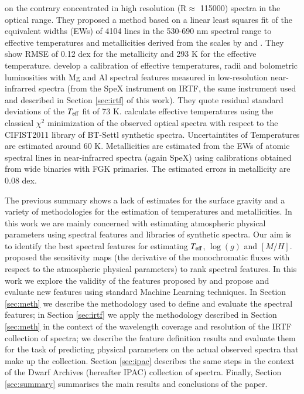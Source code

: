 \cite{2014A&A...568A.121N} on the contrary concentrated in
high resolution (R$\approx$ 115000) spectra in the optical range.
They proposed a method based on a linear least squares fit of the
equivalent widths (EWs) of 4104 lines in the 530-690 nm spectral range
to effective temperatures and metallicities derived from the scales
by \cite{2012A&A...538A..25N} and \cite{2008MNRAS.389..585C}. 
They show RMSE of 0.12 dex for the metallicity and 293 K for the effective
temperature. \cite{2015ApJ...800...85N} develop a calibration of
effective temperatures, radii and bolometric luminosities with Mg and
Al spectral features measured in low-resolution near-infrarred spectra
(from the SpeX instrument on IRTF, the same instrument used and
described in Section \ref{sec:irtf} of this work). 
They quote residual
standard deviations of the $T_{\rm eff}$ fit of 73 K. \cite{Mann2015}
calculate effective temperatures using the classical $\chi^2$
minimization of the observed optical spectra with respect to the
CIFIST2011 library of BT-Settl synthetic spectra. 
Uncertaintites of Temperatures are estimated around 60 K. 
Metallicities are estimated from the EWs of
atomic spectral lines in near-infrarred spectra (again SpeX) using
calibrations obtained from wide binaries with FGK primaries. The
estimated errors in metallicity are 0.08 dex. 

The previous summary shows a lack of estimates for the surface gravity
and a variety of methodologies for the estimation of temperatures and
metallicities. In this work we are mainly concerned with estimating
atmospheric physical parameters using spectral features and libraries
of synthetic spectra. Our aim is to identify the best spectral
features for estimating $T_{\rm eff}$, $\log(g)$ and
$[M/H]$. \cite{cesetti} proposed the sensitivity maps (the derivative
of the monochromatic fluxes with respect to the atmospheric physical
parameters) to rank spectral features. In this work we explore the
validity of the features proposed by \cite{cesetti} and propose and
evaluate new features using standard Machine Learning techniques. In
Section \ref{sec:meth} we describe the methodology used to define and
evaluate the spectral features; in Section \ref{sec:irtf} we apply the
methodology described in Section \ref{sec:meth} in the context of the
wavelength coverage and resolution of the IRTF collection of spectra;
we describe the feature definition results and evaluate them for the
task of predicting physical parameters on the actual observed spectra
that make up the collection. Section \ref{sec:ipac} describes the same
steps in the context of the Dwarf Archives (hereafter IPAC) collection
of spectra. Finally, Section \ref{sec:summary} summarises the main
results and conclusions of the paper.
